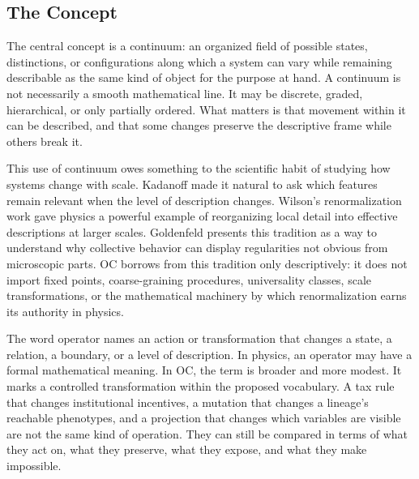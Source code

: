 \documentclass[11pt,a4paper,openany]{book}
\begin{document}
\subsection{The Concept}
The central concept is a continuum: an organized field of possible states, distinctions, or configurations along which a system can vary while remaining describable as the same kind of object for the purpose at hand. A continuum is not necessarily a smooth mathematical line. It may be discrete, graded, hierarchical, or only partially ordered. What matters is that movement within it can be described, and that some changes preserve the descriptive frame while others break it. \cite{goldenfeld_lectures,kadanoff_scaling}\par
This use of continuum owes something to the scientific habit of studying how systems change with scale. Kadanoff made it natural to ask which features remain relevant when the level of description changes. Wilson's renormalization work gave physics a powerful example of reorganizing local detail into effective descriptions at larger scales. Goldenfeld presents this tradition as a way to understand why collective behavior can display regularities not obvious from microscopic parts. OC borrows from this tradition only descriptively: it does not import fixed points, coarse-graining procedures, universality classes, scale transformations, or the mathematical machinery by which renormalization earns its authority in physics.\par
The word operator names an action or transformation that changes a state, a relation, a boundary, or a level of description. In physics, an operator may have a formal mathematical meaning. In OC, the term is broader and more modest. It marks a controlled transformation within the proposed vocabulary. A tax rule that changes institutional incentives, a mutation that changes a lineage's reachable phenotypes, and a projection that changes which variables are visible are not the same kind of operation. They can still be compared in terms of what they act on, what they preserve, what they expose, and what they make impossible.\par
\end{document}
